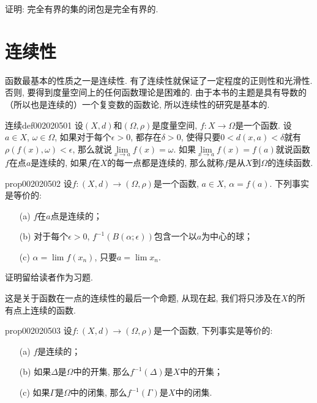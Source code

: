 \begin{exercise}
证明: 完全有界的集的闭包是完全有界的. 
\end{exercise}



\section{连续性}\label{section0020205}
函数最基本的性质之一是连续性. 有了连续性就保证了一定程度的正则性和光滑性. 否则, 要得到度量空间上的任何函数理论是困难的. 由于本书的主题是具有导数的（所以也是连续的）一个复变数的函数论, 所以连续性的研究是基本的. 

\begin{definition}{连续}{def002020501}
设$(X, d)$和$(\Omega, \rho)$是度量空间, $f:X \to \Omega$是一个函数. 设$a \in X$, $\omega \in \Omega$, 如果对于每个$\epsilon > 0$, 都存在$\delta > 0$, 使得只要$0 < d(x, a) < \delta$就有$\rho(f(x), \omega) < \epsilon$, 那么就说$\lim\limits_{x \to a}{f(x)} = \omega$. 如果$\lim\limits_{x \to a}{f(x)} = f(a)$就说函数$f$在点$a$是连续的, 如果$f$在$X$的每一点都是连续的, 那么就称$f$是从$X$到$\Omega$的连续函数. 
\end{definition}

\begin{proposition}{}{prop002020502}
设$f: (X, d) \to (\Omega, \rho)$是一个函数, $a \in X$, $\alpha = f(a)$. 下列事实是等价的: 
\begin{enumerate}
\item[(a)]$f$在$a$点是连续的；
\item[(b)]对于每个$\epsilon > 0$, $f^{-1}(B(\alpha; \epsilon))$包含一个以$a$为中心的球；
\item[(c)]$\alpha = \lim{f(x_n)}$, 只要$a = \lim{x_n}$. 
\end{enumerate}
\end{proposition}

证明留给读者作为习题. 

这是关于函数在一点的连续性的最后一个命题, 从现在起, 我们将只涉及在$X$的所有点上连续的函数. 

\begin{proposition}{}{prop002020503}
设$f: (X, d) \to (\Omega, \rho)$是一个函数, 下列事实是等价的: 
\begin{enumerate}
\item[(a)]$f$是连续的；
\item[(b)]如果$\Delta$是$\Omega$中的开集, 那么$f^{-1}(\Delta)$是$X$中的开集；
\item[(c)]如果$\Gamma$是$\Omega$中的闭集, 那么$f^{-1}(\Gamma)$是$X$中的闭集. 
\end{enumerate}
\end{proposition}

